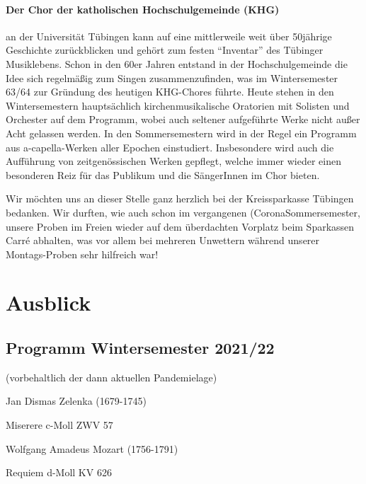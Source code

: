\documentclass[a5paper,twoside,fontsize=10pt]{scrartcl}
\newcommand{\komponist}[1]{{\Large #1}}
\newcommand{\werk}[1]{{\Large #1}}
\begin{document}
\paragraph{Der Chor der katholischen Hochschulgemeinde (KHG)} an der Universität Tübingen kann auf eine mittlerweile weit über 50jährige Geschichte zurückblicken und gehört zum festen \enquote{Inventar} des Tübinger Musiklebens.
Schon in den 60er Jahren entstand in der Hochschulgemeinde die Idee sich regelmäßig zum Singen zusammenzufinden, was im Wintersemester 63/64 zur Gründung des heutigen KHG-Chores führte.
Heute stehen in den Wintersemestern hauptsächlich kirchenmusikalische Oratorien mit Solisten und Orchester auf dem Programm, wobei auch seltener aufgeführte Werke nicht außer Acht gelassen werden.
In den Sommersemestern wird in der Regel ein Programm aus a-capella-Werken aller Epochen einstudiert.
Insbesondere wird auch die Aufführung von zeitgenössischen Werken gepflegt, welche immer wieder einen besonderen Reiz für das Publikum und die SängerInnen im Chor bieten.

\bigskip

\noindent Wir möchten uns an dieser Stelle ganz herzlich bei der Kreissparkasse Tübingen bedanken.
Wir durften, wie auch schon im vergangenen (Corona\discretionary{-)}{}{-)}Sommer\-semester, unsere Proben im Freien wieder auf dem überdachten Vorplatz beim Sparkassen Carré abhalten, was vor allem bei mehreren Unwettern während unserer Montags-Proben sehr hilfreich war!

\newpage
{}
\section*{Ausblick}
\subsection*{Programm Wintersemester 2021/22}
(vorbehaltlich der dann aktuellen Pandemielage)
\vspace{2ex}

\begin{center}
    \begin{minipage}{\widthof{\komponist{Wolfgang Amadeus Mozart (1756-1791) }}}
        \komponist{Jan Dismas Zelenka (1679-1745)}
        \vspace{0.8ex}
        
        \werk{Miserere c-Moll ZWV 57}
        \vspace{2.5ex}
        
        \komponist{Wolfgang Amadeus Mozart (1756-1791)}
        \vspace{0.8ex}
        
        \werk{Requiem d-Moll KV 626}
    \end{minipage}
\end{center}
\vspace{2ex}
\end{document}
